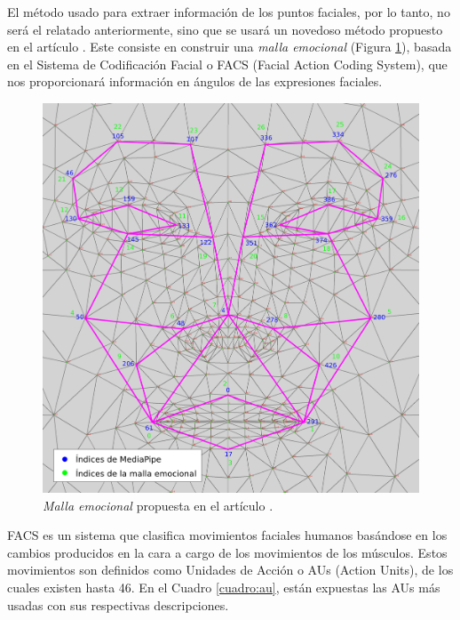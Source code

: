 El método usado para extraer información de los puntos faciales, por lo tanto, no será el relatado anteriormente, sino que se usará un novedoso método propuesto en el artículo \cite{mediapipe_emotions}. Este consiste en construir una \textit{malla emocional} (Figura \ref{fig:malla_emocional}), basada en el Sistema de Codificación Facial o FACS (Facial Action Coding System)\cite{Ekman1978FacialAC}\cite{Ekman1978FacialACManual}, que nos proporcionará información en ángulos de las expresiones faciales.

\begin{figure} [h!]
  \begin{center}
    \includegraphics[width=13cm]{figs/emotional_mesh.png}
  \end{center}
  \captionsetup{justification=centering}
  \caption{\textit{Malla emocional} propuesta en el artículo \cite{mediapipe_emotions}.}
  \label{fig:malla_emocional}
\end{figure}

FACS es un sistema que clasifica movimientos faciales humanos basándose en los cambios producidos en la cara a cargo de los movimientos de los músculos. Estos movimientos son definidos como Unidades de Acción o AUs (Action Units), de los cuales existen hasta 46. En el Cuadro \ref{cuadro:au}, están expuestas las AUs más usadas con sus respectivas descripciones.\\

